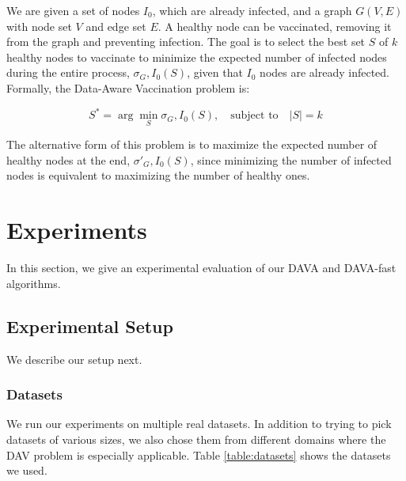 \documentclass{article}
\begin{document}
We are given a set of nodes $I_0$, which are already infected, and a graph $G(V, E)$ with node set $V$ and edge set $E$. A healthy node can be vaccinated, removing it from the graph and preventing infection. The goal is to select the best set $S$ of $k$ healthy nodes to vaccinate to minimize the expected number of infected nodes during the entire process, $\sigma_G,I_0(S)$, given that $I_0$ nodes are already infected. Formally, the Data-Aware Vaccination problem is:

\begin{equation}
S^* = \arg \min_{S} \sigma_G,I_0(S), \quad \text{subject to} \quad |S| = k
\end{equation}

The alternative form of this problem is to maximize the expected number of healthy nodes at the end, $\sigma'_G,I_0(S)$, since minimizing the number of infected nodes is equivalent to maximizing the number of healthy ones.

\section{Experiments}

In this section, we give an experimental evaluation of our DAVA and DAVA-fast algorithms.

\subsection{Experimental Setup}

We describe our setup next.

\subsubsection{Datasets}

We run our experiments on multiple real datasets. In addition to trying to pick datasets of various sizes, we also chose them from different domains where the DAV problem is especially applicable. Table \ref{table:datasets} shows the datasets we used.
\end{document}
